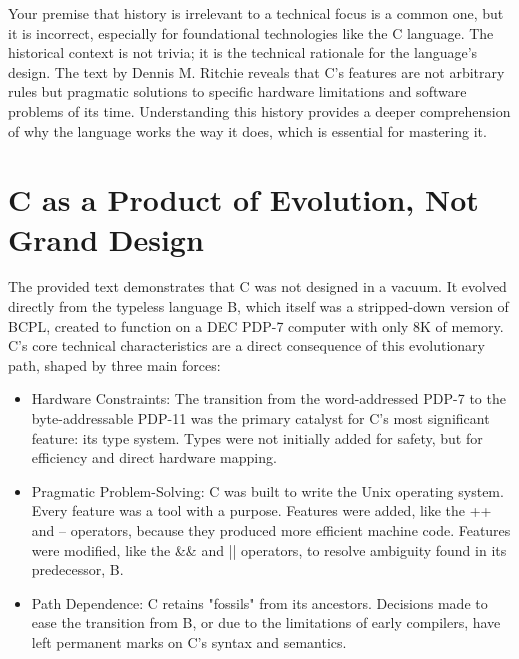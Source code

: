 Your premise that history is irrelevant to a technical focus is a common one, but it is incorrect, especially for foundational technologies like the C language. The historical context is not trivia; it is the technical rationale for the language's design. The text by Dennis M. Ritchie reveals that C's features are not arbitrary rules but pragmatic solutions to specific hardware limitations and software problems of its time. Understanding this history provides a deeper comprehension of why the language works the way it does, which is essential for mastering it.

\section{C as a Product of Evolution, Not Grand Design}

The provided text demonstrates that C was not designed in a vacuum. It evolved directly from the typeless language B, which itself was a stripped-down version of BCPL, created to function on a DEC PDP-7 computer with only 8K of memory. C's core technical characteristics are a direct consequence of this evolutionary path, shaped by three main forces:

\begin{itemize}
  \item Hardware Constraints: The transition from the word-addressed PDP-7 to the byte-addressable PDP-11 was the primary catalyst for C's most significant feature: its type system. Types were not initially added for safety, but for efficiency and direct hardware mapping.

  \item Pragmatic Problem-Solving: C was built to write the Unix operating system. Every feature was a tool with a purpose. Features were added, like the ++ and -- operators, because they produced more efficient machine code. Features were modified, like the \&\& and || operators, to resolve ambiguity found in its predecessor, B.

  \item Path Dependence: C retains "fossils" from its ancestors. Decisions made to ease the transition from B, or due to the limitations of early compilers, have left permanent marks on C's syntax and semantics.


\end{itemize}